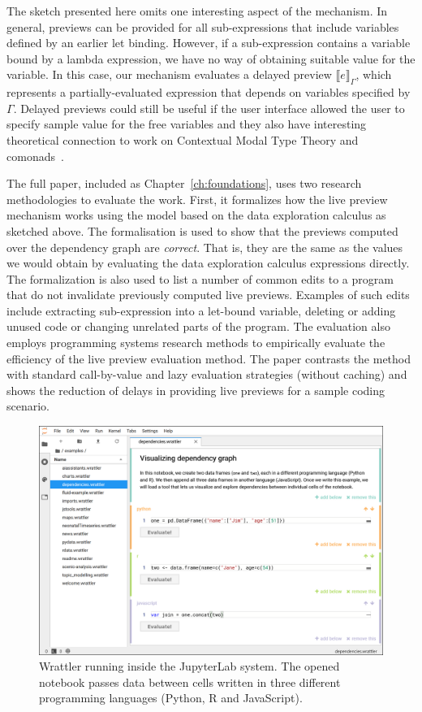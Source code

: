 \documentclass[fleqn,11pt]{report}
\theoremstyle{definition}
\begin{document}
The sketch presented here omits one interesting aspect of the mechanism. In general, previews
can be provided for all sub-expressions that include variables defined by an earlier let binding.
However, if a sub-expression contains a variable bound by a lambda expression, we have no
way of obtaining suitable value for the variable. In this case, our mechanism evaluates
a delayed preview $\llbracket e \rrbracket_\Gamma$, which represents a partially-evaluated
expression that depends on variables specified by $\Gamma$. Delayed previews could still be
useful if the user interface allowed the user to specify sample value for the free variables
and they also have interesting theoretical connection to work on Contextual Modal Type Theory
\citep{nanevski-2008-cmtt} and comonads~\citep{gabbay-2013-cmtt}.

The full paper, included as Chapter~\ref{ch:foundations}, uses two research methodologies
to evaluate the work. First, it formalizes how the live preview mechanism works using the
model based on the data exploration calculus as sketched above. The formalisation is
used to show that the previews computed over the dependency graph are \emph{correct}. That is,
they are the same as the values we would obtain by evaluating the data exploration calculus
expressions directly. The formalization is also used to list a number of common edits to
a program that do not invalidate previously computed live previews. Examples of such edits
include extracting sub-expression into a let-bound variable, deleting or adding unused code
or changing unrelated parts of the program. The evaluation also employs programming systems
research methods to empirically evaluate the efficiency of the live preview evaluation method.
The paper contrasts the method with standard call-by-value and lazy evaluation strategies
(without caching) and shows the reduction of delays in providing live previews for a sample
coding scenario.

\begin{figure}[t]
\includegraphics[scale=0.25]{img/wrattler.png}
\caption{Wrattler running inside the JupyterLab system. The opened notebook passes data between
cells written in three different programming languages (Python, R and JavaScript).}
\label{fig:wrattler}
\end{figure}
\end{document}
